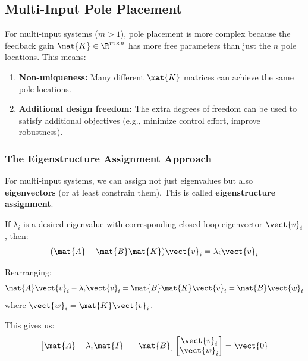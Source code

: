 
\subsection{Multi-Input Pole Placement}
\label{subsec:multi_input_pole_placement}

For multi-input systems ($m > 1$), pole placement is more complex because the feedback gain $\mat{K} \in \R^{m \times n}$ has more free parameters than just the $n$ pole locations. This means:

\begin{enumerate}
    \item \textbf{Non-uniqueness:} Many different $\mat{K}$ matrices can achieve the same pole locations.
    \item \textbf{Additional design freedom:} The extra degrees of freedom can be used to satisfy additional objectives (e.g., minimize control effort, improve robustness).
\end{enumerate}

\subsubsection{The Eigenstructure Assignment Approach}

For multi-input systems, we can assign not just eigenvalues but also \textbf{eigenvectors} (or at least constrain them). This is called \textbf{eigenstructure assignment}.

If $\lambda_i$ is a desired eigenvalue with corresponding closed-loop eigenvector $\vect{v}_i$, then:
\begin{equation}
(\mat{A} - \mat{B}\mat{K})\vect{v}_i = \lambda_i\vect{v}_i
\end{equation}

Rearranging:
\begin{equation}
\mat{A}\vect{v}_i - \lambda_i\vect{v}_i = \mat{B}\mat{K}\vect{v}_i = \mat{B}\vect{w}_i
\end{equation}
where $\vect{w}_i = \mat{K}\vect{v}_i$.

This gives us:
\begin{equation}
\begin{bmatrix} \mat{A} - \lambda_i\mat{I} & -\mat{B} \end{bmatrix}
\begin{bmatrix} \vect{v}_i \\ \vect{w}_i \end{bmatrix} = \vect{0}
\label{eq:eigenstructure_constraint}
\end{equation}

